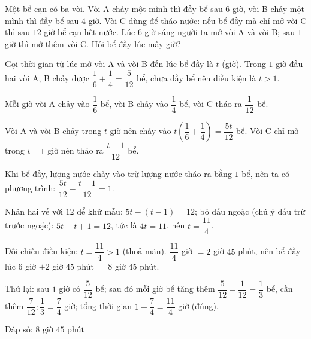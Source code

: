 \begin{problem}[8DS-PT1-047]
Một bể cạn có ba vòi. Vòi A chảy một mình thì đầy bể sau $6$ giờ, vòi B chảy một mình thì đầy bể sau $4$ giờ. Vòi C dùng để tháo nước: nếu bể đầy mà chỉ mở vòi C thì sau $12$ giờ bể cạn hết nước. Lúc $6$ giờ sáng người ta mở vòi A và vòi B; sau $1$ giờ thì mở thêm vòi C. Hỏi bể đầy lúc mấy giờ?

\begin{solution}
Gọi thời gian từ lúc mở vòi A và vòi B đến lúc bể đầy là $t$ (giờ). Trong $1$ giờ đầu hai vòi A, B chảy được $\dfrac{1}{6} + \dfrac{1}{4} = \dfrac{5}{12}$ bể, chưa đầy bể nên điều kiện là $t > 1$.

Mỗi giờ vòi A chảy vào $\dfrac{1}{6}$ bể, vòi B chảy vào $\dfrac{1}{4}$ bể, vòi C tháo ra $\dfrac{1}{12}$ bể.

Vòi A và vòi B chảy trong $t$ giờ nên chảy vào $t\left(\dfrac{1}{6} + \dfrac{1}{4}\right) = \dfrac{5t}{12}$ bể. Vòi C chỉ mở trong $t - 1$ giờ nên tháo ra $\dfrac{t - 1}{12}$ bể.

Khi bể đầy, lượng nước chảy vào trừ lượng nước tháo ra bằng $1$ bể, nên ta có phương trình: $\dfrac{5t}{12} - \dfrac{t - 1}{12} = 1$.

Nhân hai vế với $12$ để khử mẫu: $5t - (t - 1) = 12$; bỏ dấu ngoặc (chú ý dấu trừ trước ngoặc): $5t - t + 1 = 12$, tức là $4t = 11$, nên $t = \dfrac{11}{4}$.

Đối chiếu điều kiện: $t = \dfrac{11}{4} > 1$ (thoả mãn). $\dfrac{11}{4}$ giờ $= 2$ giờ $45$ phút, nên bể đầy lúc $6$ giờ $+ 2$ giờ $45$ phút $= 8$ giờ $45$ phút.

Thử lại: sau $1$ giờ có $\dfrac{5}{12}$ bể; sau đó mỗi giờ bể tăng thêm $\dfrac{5}{12} - \dfrac{1}{12} = \dfrac{1}{3}$ bể, cần thêm $\dfrac{7}{12} : \dfrac{1}{3} = \dfrac{7}{4}$ giờ; tổng thời gian $1 + \dfrac{7}{4} = \dfrac{11}{4}$ giờ (đúng).

Đáp số: $\boxed{8 \text{ giờ } 45 \text{ phút}}$
\end{solution}
\end{problem}

